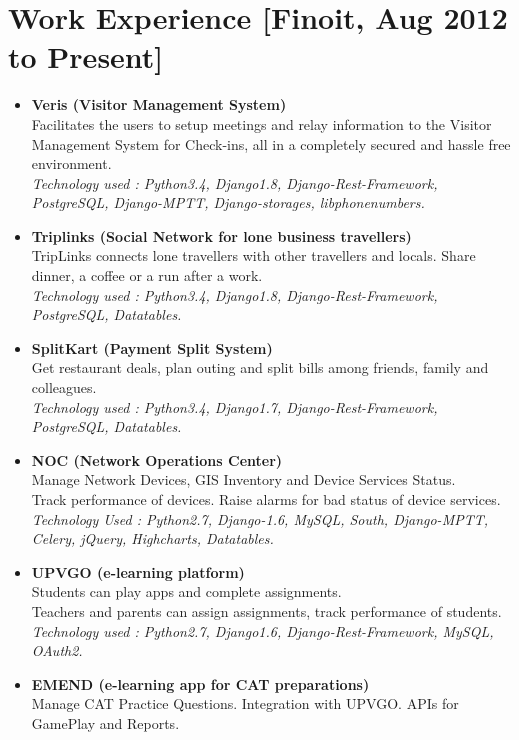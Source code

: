 \documentclass[11pt]{article}
\begin{document}
\section*{Work Experience [Finoit, Aug 2012 to Present]}
\begin{itemize}
 \item \textbf{Veris (Visitor Management System)}
    \\ Facilitates the users to setup meetings and relay information to the Visitor Management System for Check-ins, all in a completely secured and hassle free environment.
    \\ \textit{Technology used : Python3.4, Django1.8, Django-Rest-Framework, PostgreSQL, Django-MPTT, Django-storages, libphonenumbers.}
 \item \textbf{Triplinks (Social Network for lone business travellers)}
    \\ TripLinks connects lone travellers with other travellers and locals. Share dinner, a coffee or a run after a work.
    \\ \textit{Technology used : Python3.4, Django1.8, Django-Rest-Framework, PostgreSQL, Datatables.}
 \item \textbf{SplitKart (Payment Split System)}
    \\ Get restaurant deals, plan outing and split bills among friends, family and colleagues.
    \\ \textit{Technology used : Python3.4, Django1.7, Django-Rest-Framework, PostgreSQL, Datatables.}
 \item \textbf{NOC (Network Operations Center)}
    \\ Manage Network Devices, GIS Inventory and Device Services Status.
    \\ Track performance of devices. Raise alarms for bad status of device services.
    \\ \textit{Technology Used : Python2.7, Django-1.6, MySQL, South, Django-MPTT, Celery, jQuery, Highcharts, Datatables.}
 \item \textbf{UPVGO (e-learning platform)}
    \\ Students can play apps and complete assignments.
    \\ Teachers and parents can assign assignments, track performance of students.
    \\ \textit{Technology used : Python2.7, Django1.6, Django-Rest-Framework, MySQL, OAuth2.}
 \item \textbf{EMEND (e-learning app for CAT preparations)}
    \\ Manage CAT Practice Questions. Integration with UPVGO. APIs for GamePlay and Reports.

\end{itemize}
\end{document}
